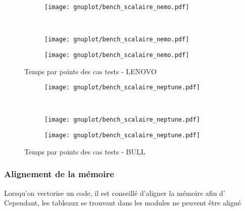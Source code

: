 \begin{figure}[h!]
  \centering
  \begin{subfigure}[b]{0.5\textwidth}
    \centering
    \texttt{[image: gnuplot/bench\_scalaire\_nemo.pdf]}
  \caption{\label{fig:bench_scal_nemo_nonper}}
  \end{subfigure}%
  ~
  \begin{subfigure}[b]{0.5\textwidth}
    \centering
    \texttt{[image: gnuplot/bench\_scalaire\_nemo.pdf]}
  \caption{\label{fig:bench_scal_nemo_sym}}
  \end{subfigure}
  \begin{subfigure}[b]{0.5\textwidth}
    \centering
    \texttt{[image: gnuplot/bench\_scalaire\_nemo.pdf]}
  \caption{\label{fig:bench_scal_nemo_per}}
  \end{subfigure}
  \caption{\label{fig:bench_scal_nemo}Temps par points des cas tests - LENOVO}
\end{figure}


\begin{figure}[h!]
  \centering
  \begin{subfigure}[b]{0.5\textwidth}
    \centering
    \texttt{[image: gnuplot/bench\_scalaire\_neptune.pdf]}
  \caption{\label{fig:bench_scal_neptune_nonper}}
  \end{subfigure}%
  ~
  \begin{subfigure}[b]{0.5\textwidth}
    \centering
    \texttt{[image: gnuplot/bench\_scalaire\_neptune.pdf]}
  \caption{\label{fig:bench_scal_neptune_sym}}
  \end{subfigure}
  \begin{subfigure}[b]{0.5\textwidth}
    \centering
    \texttt{[image: gnuplot/bench\_scalaire\_neptune.pdf]}
  \caption{\label{fig:bench_scal_neptune_per}}
  \end{subfigure}
  \caption{\label{fig:bench_scal_neptune}Temps par points des cas tests - BULL}
\end{figure}




\subsubsection{Alignement de la mémoire}
Lorsqu'on vectorise un code, il est conseillé d'aligner la mémoire afin d'
Cependant, les tableaux se trouvant dans les modules ne peuvent être aligné

